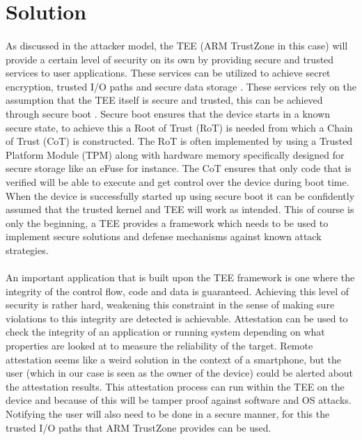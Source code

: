 \documentclass{report}
\begin{document}
\section{Solution}

\paragraph*{}
As discussed in the attacker model, the TEE (ARM TrustZone in this case) will provide a certain level of security on its own by providing secure and trusted services to user applications. These services can be utilized to achieve secret encryption, trusted I/O paths and secure data storage \cite{PintoSandro2019DATA}. These services rely on the assumption that the TEE itself is secure and trusted, this can be achieved through secure boot \cite{JiangHang2017IaAS}. Secure boot ensures that the device starts in a known secure state, to achieve this a Root of Trust (RoT) is needed from which a Chain of Trust (CoT) is constructed. The RoT is often implemented by using a Trusted Platform Module (TPM) along with hardware memory specifically designed for secure storage like an eFuse for instance. The CoT ensures that only code that is verified will be able to execute and get control over the device during boot time. When the device is successfully started up using secure boot it can be confidently assumed that the trusted kernel and TEE will work as intended. This of course is only the beginning, a TEE provides a framework which needs to be used to implement secure solutions and defense mechanisms against known attack strategies. 

\paragraph*{}
An important application that is built upon the TEE framework is one where the integrity of the control flow, code and data is guaranteed. Achieving this level of security is rather hard, weakening this constraint in the sense of making sure violations to this integrity are detected is achievable. Attestation can be used to check the integrity of an application or running system depending on what properties are looked at to measure the reliability of the target. Remote attestation seems like a weird solution in the context of a smartphone, but the user (which in our case is seen as the owner of the device) could be alerted about the attestation results. This attestation process can run within the TEE on the device and because of this will be tamper proof against software and OS attacks. Notifying the user will also need to be done in a secure manner, for this the trusted I/O paths that ARM TrustZone provides can be used. 
\end{document}
